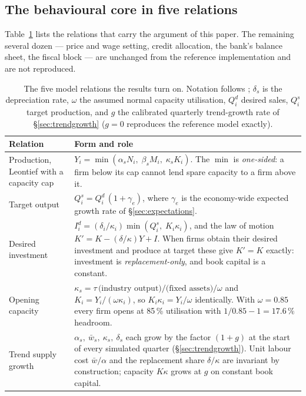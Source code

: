 \documentclass[11pt,a4paper]{article}
\begin{document}
\subsection{The behavioural core in five relations}

Table~\ref{tab:equations} lists the relations that carry the argument of this paper. The remaining
several dozen --- price and wage setting, credit allocation, the bank's balance sheet, the fiscal
block --- are unchanged from the reference implementation and are not reproduced.

\begin{table}[t]
\centering
\caption{The five model relations the results turn on. Notation follows \citet{poledna2023};
$\delta_s$ is the depreciation rate, $\omega$ the assumed normal capacity utilisation, $Q^d_i$
desired sales, $Q^s_i$ target production, and $g$ the calibrated quarterly trend-growth rate of
\S\ref{sec:trendgrowth} ($g=0$ reproduces the reference model exactly).}
\label{tab:equations}
\small
\begin{tabular}{@{}p{}p{}@{}}
\toprule
\textbf{Relation} & \textbf{Form and role} \\
\midrule
Production, Leontief with a capacity cap &
$Y_i=\min(\alpha_s N_i,\;\beta_s M_i,\;\kappa_s K_i)$. The $\min$ is \emph{one-sided}: a firm
below its cap cannot lend spare capacity to a firm above it. \\[2pt]
Target output &
$Q^s_i = Q^d_i\,(1+\gamma_e)$, where $\gamma_e$ is the economy-wide expected growth rate of
\S\ref{sec:expectations}. \\[2pt]
Desired investment &
$I^d_i=(\delta_i/\kappa_i)\min(Q^s_i,\;K_i\kappa_i)$, and the law of motion
$K'=K-(\delta/\kappa)Y+I$. When firms obtain their desired investment and produce at target these
give $K'=K$ exactly: investment is \emph{replacement-only}, and book capital is a constant. \\[2pt]
Opening capacity &
$\kappa_s=\tau\,\text{(industry output)}/\text{(fixed assets)}/\omega$ and $K_i=Y_i/(\omega\kappa_i)$,
so $K_i\kappa_i=Y_i/\omega$ identically. With $\omega=0.85$ every firm opens at 85\,\% utilisation
with $1/0.85-1=17.6\,\%$ headroom. \\[2pt]
Trend supply growth &
$\alpha_s,\ \bar w_s,\ \kappa_s,\ \delta_s$ each grow by the factor $(1+g)$ at the start of every
simulated quarter (\S\ref{sec:trendgrowth}). Unit labour cost $\bar w/\alpha$ and the replacement
share $\delta/\kappa$ are invariant by construction; capacity $K\kappa$ grows at $g$ on constant
book capital. \\
\bottomrule
\end{tabular}
\end{table}
\end{document}
